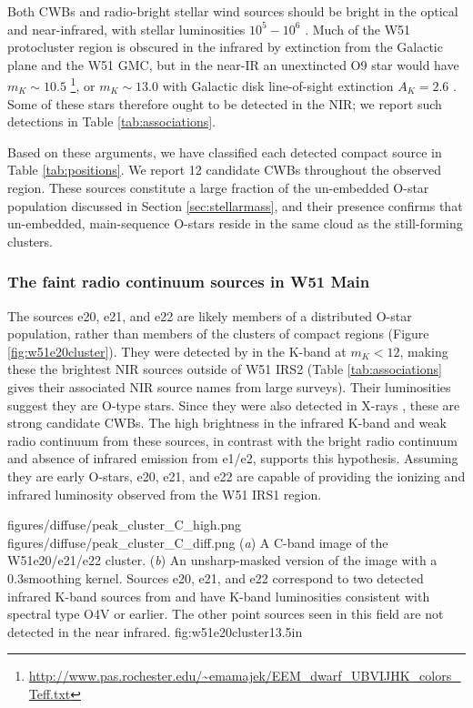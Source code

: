 Both CWBs and radio-bright stellar wind sources should be bright in the
optical and near-infrared, with stellar luminosities $10^5-10^6$ \lsun.
Much of the W51 protocluster region is obscured in the infrared by extinction
from the Galactic plane and the W51 GMC, but in the near-IR an unextincted O9
star would have
$m_K\sim10.5$
\citep{Pecaut2013a}\footnote{\url{http://www.pas.rochester.edu/~emamajek/EEM_dwarf_UBVIJHK_colors_Teff.txt}},
or $m_K\sim 13.0$ with Galactic disk line-of-sight extinction $A_K=2.6$
\citep{Goldader1994a}.  Some of these stars therefore ought to be detected in
the NIR; we report such detections in Table \ref{tab:associations}.

Based on these arguments, we have classified each detected compact source in
Table \ref{tab:positions}.  We report 12 candidate CWBs throughout the observed
region.  These sources constitute a large fraction of the un-embedded O-star
population discussed in Section \ref{sec:stellarmass}, and their presence confirms
that un-embedded, main-sequence O-stars reside in the same cloud as the still-forming
clusters.

\subsubsection{The faint radio continuum sources in W51 Main}
\label{sec:faintw51main}

The sources e20, e21, and e22 are likely members of a distributed O-star
population, rather than members of the clusters of compact \hii regions (Figure
\ref{fig:w51e20cluster}).  They were detected by \citet{Goldader1994a} in the
K-band at $m_K < 12$, making these the brightest NIR sources outside of W51
IRS2 (Table \ref{tab:associations} gives their associated NIR source names
from large surveys).  Their luminosities suggest they are O-type stars.  Since
they were also detected in X-rays \citep{Townsley2014a}, these are strong
candidate CWBs.  The high brightness in the infrared K-band and weak radio
continuum from these sources, in contrast with the bright radio continuum and
absence of infrared emission from e1/e2, supports this hypothesis.  
Assuming they are early O-stars, e20, e21, and e22 are capable of providing the
ionizing and infrared luminosity observed from the W51 IRS1 \hii region.

\FigureTwo
{figures/diffuse/peak_cluster_C_high.png}
{figures/diffuse/peak_cluster_C_diff.png}
{({\it a}) A C-band image of the W51e20/e21/e22 cluster.
({\it b}) An unsharp-masked version of the image with a 0.3\arcsec smoothing
kernel. 
Sources e20, e21, and e22 correspond to two detected infrared K-band sources from
\citet[][Table \ref{tab:associations}]{Goldader1994a} and have K-band
luminosities consistent with spectral type O4V or earlier.  The other point
sources seen in this field are not detected in the near infrared.
}
{fig:w51e20cluster}{1}{3.5in}


